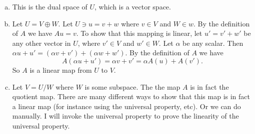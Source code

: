 \begin{problem}
	\begin{solution}
		\begin{enumerate}[(a)]
			\item This is the dual space of $ U $, which is a vector space.
			\item Let $ U = V \oplus W $. Let $ U \ni u = v + w $ where $ v\in V $ and $ W\in w $. By the definition of $ A $ we have $ Au = v $. To show that this mapping is linear, let $ u' = v' + w' $ be any other vector in $ U $, where $ v'\in V $ and $ w'\in W $. Let $ \alpha $ be any scalar. Then $ \alpha u  + u' = (\alpha v + v')  + (\alpha w+w') $. By the definition of $ A $ we have \[ A(\alpha  u + u') = \alpha v + v' = \alpha A(u) + A(v'). \]
			So $ A $ is a linear map from $ U $ to $ V $.
			\item Let $ V = U / W $ where $ W $ is some subspace. The the map $ A $ is in fact the quotient map. There are many different ways to show that this map is in fact a linear map (for instance using the universal property, etc). Or we can do manually. I will invoke the universal property to prove the linearity of the universal property.
		\end{enumerate}
		
	\end{solution}
\end{problem}




